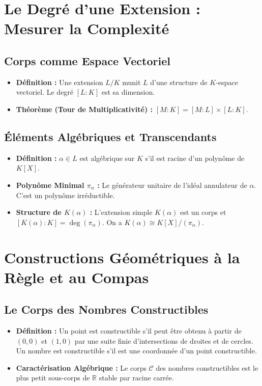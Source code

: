 \documentclass[12pt, a4paper, parskip=full]{report}
\theoremstyle{agregstyle}
\begin{document}
\section{Le Degré d'une Extension : Mesurer la Complexité}
\subsection{Corps comme Espace Vectoriel}
\begin{itemize}
    \item \textbf{Définition :} Une extension $L/K$ munit $L$ d'une structure de $K$-espace vectoriel. Le degré $[L:K]$ est sa dimension.
    \item \textbf{Théorème (Tour de Multiplicativité) :} $[M:K] = [M:L] \times [L:K]$.
\end{itemize}
\subsection{Éléments Algébriques et Transcendants}
\begin{itemize}
    \item \textbf{Définition :} $\alpha \in L$ est algébrique sur $K$ s'il est racine d'un polynôme de $K[X]$.
    \item \textbf{Polynôme Minimal $\pi_\alpha$ :} Le générateur unitaire de l'idéal annulateur de $\alpha$. C'est un polynôme irréductible.
    \item \textbf{Structure de $K(\alpha)$ :} L'extension simple $K(\alpha)$ est un corps et $[K(\alpha):K] = \deg(\pi_\alpha)$. On a $K(\alpha) \cong K[X]/(\pi_\alpha)$.
\end{itemize}

\section{Constructions Géométriques à la Règle et au Compas}
\subsection{Le Corps des Nombres Constructibles}
\begin{itemize}
    \item \textbf{Définition :} Un point est constructible s'il peut être obtenu à partir de $(0,0)$ et $(1,0)$ par une suite finie d'intersections de droites et de cercles. Un nombre est constructible s'il est une coordonnée d'un point constructible.
    \item \textbf{Caractérisation Algébrique :} Le corps $\mathcal{C}$ des nombres constructibles est le plus petit sous-corps de $\mathbb{R}$ stable par racine carrée.
\end{itemize}
\end{document}
